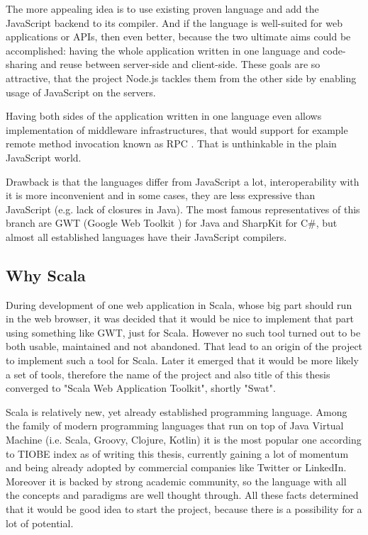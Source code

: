 \documentclass[12pt,a4paper]{report}
\begin{document}
The more appealing idea is to use existing proven language and add the JavaScript backend to its compiler. And if the language is well-suited for web applications or APIs, then even better, because the two ultimate aims could be accomplished: having the whole application written in one language and code-sharing and reuse between server-side and client-side. These goals are so attractive, that the project Node.js \cite{NodeJs} tackles them from the other side by enabling usage of JavaScript on the servers.

Having both sides of the application written in one language even allows implementation of middleware infrastructures, that would support for example remote method invocation known as RPC \cite{Rpc}. That is unthinkable in the plain JavaScript world.

Drawback is that the languages differ from JavaScript a lot, interoperability with it is more inconvenient and in some cases, they are less expressive than JavaScript (e.g. lack of closures in Java). The most famous representatives of this branch are GWT (Google Web Toolkit \cite{Gwt}) for Java and SharpKit \cite{SharpKit} for C\#, but almost all established languages have their JavaScript compilers.

\subsection{Why Scala}

During development of one web application in Scala, whose big part should run in the web browser, it was decided that it would be nice to implement that part using something like GWT, just for Scala. However no such tool turned out to be both usable, maintained and not abandoned. That lead to an origin of the project to implement such a tool for Scala. Later it emerged that it would be more likely a set of tools, therefore the name of the project and also title of this thesis converged to "Scala Web Application Toolkit", shortly "Swat".

Scala is relatively new, yet already established programming language. Among the family of modern programming languages that run on top of Java Virtual Machine (i.e. Scala, Groovy, Clojure, Kotlin) it is the most popular one according to TIOBE index \cite{Tiobe} as of writing this thesis, currently gaining a lot of momentum and being already adopted by commercial companies like Twitter or LinkedIn. Moreover it is backed by strong academic community, so the language with all the concepts and paradigms are well thought through. All these facts determined that it would be good idea to start the project, because there is a possibility for a lot of potential.
\end{document}
